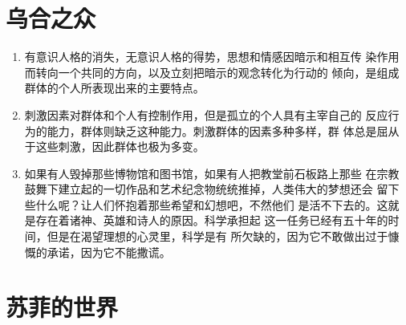 \documentclass[UTF8]{ctexart}
\begin{document}
	\newpage

	\section{乌合之众}


		\begin{enumerate}
	
			\item 有意识人格的消失，无意识人格的得势，思想和情感因暗示和相互传
			染作用而转向一个共同的方向，以及立刻把暗示的观念转化为行动的
			倾向，是组成群体的个人所表现出来的主要特点。
	
			\item 刺激因素对群体和个人有控制作用，但是孤立的个人具有主宰自己的
			反应行为的能力，群体则缺乏这种能力。刺激群体的因素多种多样，群
			体总是屈从于这些刺激，因此群体也极为多变。
			
			\item 如果有人毁掉那些博物馆和图书馆，如果有人把教堂前石板路上那些
			在宗教鼓舞下建立起的一切作品和艺术纪念物统统推掉，人类伟大的梦想还会
			留下些什么呢？让人们怀抱着那些希望和幻想吧，不然他们
			是活不下去的。这就是存在着诸神、英雄和诗人的原因。科学承担起
			这一任务已经有五十年的时间，但是在渴望理想的心灵里，科学是有
			所欠缺的，因为它不敢做出过于慷慨的承诺，因为它不能撒谎。
			
		\end{enumerate}

	\newpage
	
	\section{苏菲的世界}
	
	
\end{document}
